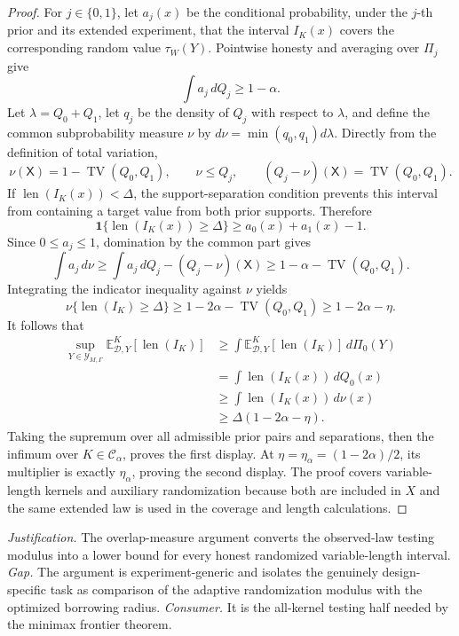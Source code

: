 \documentclass{article}
\begin{document}
\begin{proof}
For \(j\in\{0,1\}\), let \(a_j(x)\) be the conditional probability, under the \(j\)-th prior and its extended experiment, that the interval \(I_K(x)\) covers the corresponding random value \(\tau_W(Y)\).  Pointwise honesty and averaging over \(\Pi_j\) give
\[
\int a_j\,dQ_j\ge1-\alpha.
\]
Let \(\lambda=Q_0+Q_1\), let \(q_j\) be the density of \(Q_j\) with respect to \(\lambda\), and define the common subprobability measure \(\nu\) by
\(d\nu=\min(q_0,q_1)d\lambda\).  Directly from the definition of total variation,
\[
\nu(\mathsf X)=1-\operatorname{TV}(Q_0,Q_1),
\qquad \nu\le Q_j,
\qquad (Q_j-\nu)(\mathsf X)=\operatorname{TV}(Q_0,Q_1).
\]
If \(\operatorname{len}(I_K(x))<\Delta\), the support-separation condition prevents this interval from containing a target value from both prior supports.  Therefore
\[
\mathbf 1\{\operatorname{len}(I_K(x))\ge\Delta\}
\ge a_0(x)+a_1(x)-1.
\]
Since \(0\le a_j\le1\), domination by the common part gives
\[
\int a_j\,d\nu
\ge\int a_j\,dQ_j-(Q_j-\nu)(\mathsf X)
\ge1-\alpha-\operatorname{TV}(Q_0,Q_1).
\]
Integrating the indicator inequality against \(\nu\) yields
\[
\nu\{\operatorname{len}(I_K)\ge\Delta\}
\ge1-2\alpha-\operatorname{TV}(Q_0,Q_1)
\ge1-2\alpha-\eta.
\]
It follows that
\[
\begin{aligned}
\sup_{Y\in\mathcal Y_{M,\Gamma}}
 \mathbb E^K_{\mathcal D,Y}[\operatorname{len}(I_K)]
&\ge \int \mathbb E^K_{\mathcal D,Y}[\operatorname{len}(I_K)]\,d\Pi_0(Y)\\
&=\int\operatorname{len}(I_K(x))\,dQ_0(x)\\
&\ge\int\operatorname{len}(I_K(x))\,d\nu(x)\\
&\ge\Delta(1-2\alpha-\eta).
\end{aligned}
\]
Taking the supremum over all admissible prior pairs and separations, then the infimum over \(K\in\mathcal C_\alpha\), proves the first display.  At \(\eta=\eta_\alpha=(1-2\alpha)/2\), its multiplier is exactly \(\eta_\alpha\), proving the second display.  The proof covers variable-length kernels and auxiliary randomization because both are included in \(X\) and the same extended law is used in the coverage and length calculations.
\end{proof}
\par\smallskip\noindent \textit{Justification.} The overlap-measure argument converts the observed-law testing modulus into a lower bound for every honest randomized variable-length interval. \textit{Gap.} The argument is experiment-generic and isolates the genuinely design-specific task as comparison of the adaptive randomization modulus with the optimized borrowing radius. \textit{Consumer.} It is the all-kernel testing half needed by the minimax frontier theorem.
\end{document}
